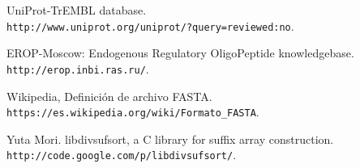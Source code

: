 \documentclass[letterpaper, 10pt, notitlepage]{report}
\newlength{\defbaselineskip}
\newcommand{\singlespacing}{\setlength{\baselineskip}{\defbaselineskip}}
\begin{document}
\begin{thebibliography}{9}
UniProt-TrEMBL database.
\\\texttt{http://www.uniprot.org/uniprot/?query=reviewed:no}.

EROP-Moscow: Endogenous Regulatory OligoPeptide knowledgebase.
\\\texttt{http://erop.inbi.ras.ru/}.

Wikipedia, Definición de archivo FASTA.
\\\texttt{https://es.wikipedia.org/wiki/Formato\_FASTA}.

Yuta Mori. libdivsufsort, a C library for suffix array construction.
\\\texttt{http://code.google.com/p/libdivsufsort/}.

\end{thebibliography}

%




\singlespacing
\cleardoublepage
\end{document}

